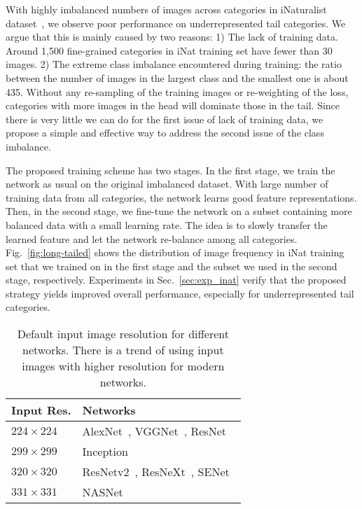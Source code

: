 \documentclass[10pt,twocolumn,letterpaper]{article}
\begin{document}
With highly imbalanced numbers of images across categories in iNaturalist dataset~\cite{inaturalist}, we observe poor performance on underrepresented tail categories.
We argue that this is mainly caused by two reasons: 
1) The lack of training data. Around 1,500 fine-grained categories in iNat training set have fewer than 30 images. 
2) The extreme class imbalance encountered during training: the ratio between the number of images in the largest class and the smallest one is about 435.
Without any re-sampling of the training images or re-weighting of the loss, categories with more images in the head will dominate those in the tail.
Since there is very little we can do for the first issue of lack of training data, we propose a simple and effective way to address the second issue of the class imbalance.

The proposed training scheme has two stages.
In the first stage, we train the network as usual on the original imbalanced dataset.
With large number of training data from all categories, the network learns good feature representations.
Then, in the second stage, we fine-tune the network on a subset containing more balanced data with a small learning rate.
The idea is to slowly transfer the learned feature and let the network re-balance among all categories.
Fig.\ \ref{fig:long-tailed} shows the distribution of image frequency in iNat training set that we trained on in the first stage and the subset we used in the second stage, respectively.
Experiments in Sec.~\ref{sec:exp_inat} verify that the proposed strategy yields improved overall performance, especially for underrepresented tail categories.


\begin{table}[t]
\small
\begin{center}
\begin{tabular}{ |l|l| } 
\hline
Input Res. & Networks \\ \hline
$224 \times 224$ & AlexNet~\cite{alexnet}, VGGNet~\cite{vggnet}, ResNet~\cite{resnet} \\
$299 \times 299$ & Inception~\cite{googlenet, inception-v3, inception-v4} \\
$320 \times 320$ & ResNetv2~\cite{resnet-v2}, ResNeXt~\cite{resnext}, SENet~\cite{senet} \\
$331 \times 331$ & NASNet~\cite{nasnet} \\ \hline
\end{tabular}
\end{center}
\caption{Default input image resolution for different networks.
There is a trend of using input images with higher resolution for modern networks.
}
\label{tab:input_size}
\end{table}
\end{document}
